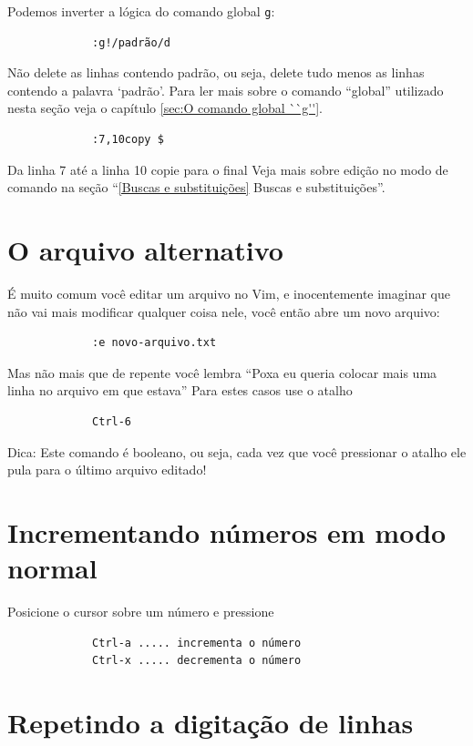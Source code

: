 \documentclass[10pt,a4paper,openany]{book}
\begin{document}
Podemos inverter a lógica do comando global \verb+g+:

\begin{verbatim}
			 :g!/padrão/d
\end{verbatim}


Não delete as linhas contendo padrão, ou seja, delete tudo menos as linhas
contendo a palavra `padrão'. Para ler mais sobre o comando ``global'' utilizado 
nesta seção veja o capítulo \ref{sec:O comando global ``g''}.

\begin{verbatim}
			 :7,10copy $
\end{verbatim}

Da linha 7 até a linha 10 copie para o final
Veja mais sobre edição no modo de comando na seção ``\ref{Buscas e
substituições} Buscas e substituições''.

\section{O arquivo alternativo}
\label{O arquivo alternativo}

É muito comum você editar um arquivo no Vim, e inocentemente imaginar
que não vai mais modificar qualquer coisa nele, você então abre um
novo arquivo:

\begin{verbatim}
			 :e novo-arquivo.txt
\end{verbatim}

Mas não mais que de repente você lembra ``Poxa eu queria colocar mais
uma linha no arquivo em que estava'' Para estes casos use o atalho

\begin{verbatim}
			 Ctrl-6
\end{verbatim}

Dica: Este comando é booleano, ou seja, cada vez que você pressionar o atalho
ele pula para o último arquivo editado!


\section{Incrementando números em modo normal}\label{Incrementando números em modo normal}
Posicione o cursor sobre um número e pressione

\begin{verbatim}
			 Ctrl-a ..... incrementa o número
			 Ctrl-x ..... decrementa o número
\end{verbatim}

\section{Repetindo a digitação de linhas}
\label{Repetindo a digitação de linhas}
\end{document}

